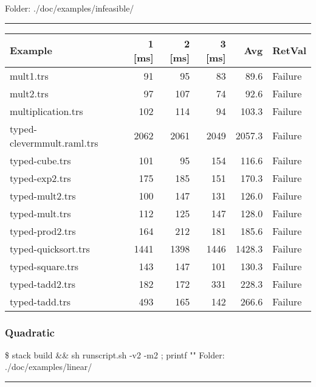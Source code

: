\documentclass[11pt]{article}
\begin{document}
Folder: ./doc/examples/infeasible/

\rule{\linewidth}{0.5pt}
\begin{center}
\begin{tabular}{lrrrrl}
\hline
Example & 1 [ms] & 2 [ms] & 3 [ms] & Avg & RetVal\\
\hline
mult1.trs & 91 & 95 & 83 & 89.6 & Failure\\
mult2.trs & 97 & 107 & 74 & 92.6 & Failure\\
multiplication.trs & 102 & 114 & 94 & 103.3 & Failure\\
typed-clevermmult.raml.trs & 2062 & 2061 & 2049 & 2057.3 & Failure\\
typed-cube.trs & 101 & 95 & 154 & 116.6 & Failure\\
typed-exp2.trs & 175 & 185 & 151 & 170.3 & Failure\\
typed-mult2.trs & 100 & 147 & 131 & 126.0 & Failure\\
typed-mult.trs & 112 & 125 & 147 & 128.0 & Failure\\
typed-prod2.trs & 164 & 212 & 181 & 185.6 & Failure\\
typed-quicksort.trs & 1441 & 1398 & 1446 & 1428.3 & Failure\\
typed-square.trs & 143 & 147 & 101 & 130.3 & Failure\\
typed-tadd2.trs & 182 & 172 & 331 & 228.3 & Failure\\
typed-tadd.trs & 493 & 165 & 142 & 266.6 & Failure\\
\hline
\end{tabular}

\end{center}

\pagebreak

\subsubsection{Quadratic}
\label{sec:org01f0220}

\$ stack build \&\& sh runscript.sh -v2 -m2 ; printf "\a"
Folder: ./doc/examples/linear/

\rule{\linewidth}{0.5pt}
\end{document}
